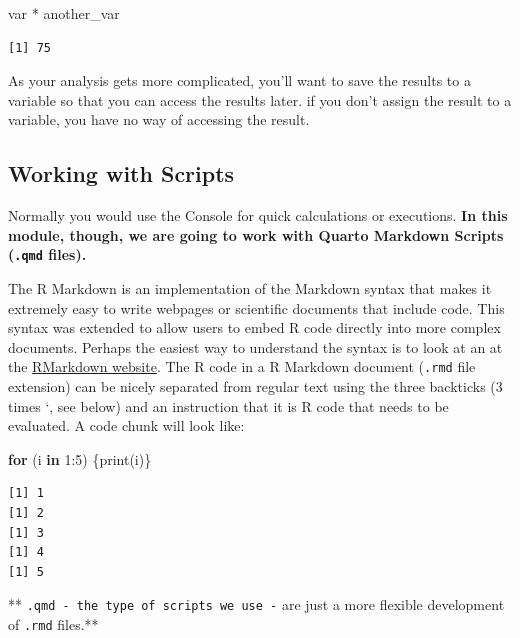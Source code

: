 \documentclass[
  letterpaper,
  DIV=11,
  numbers=noendperiod]{scrreprt}
\newenvironment{Shaded}{\begin{snugshade}}{\end{snugshade}}
\newcommand{\ControlFlowTok}[1]{\textcolor[rgb]{0.00,0.23,0.31}{\textbf{#1}}}
\newcommand{\DecValTok}[1]{\textcolor[rgb]{0.68,0.00,0.00}{#1}}
\newcommand{\FunctionTok}[1]{\textcolor[rgb]{0.28,0.35,0.67}{#1}}
\newcommand{\NormalTok}[1]{\textcolor[rgb]{0.00,0.23,0.31}{#1}}
\newcommand{\SpecialCharTok}[1]{\textcolor[rgb]{0.37,0.37,0.37}{#1}}
\begin{document}
\begin{Shaded}
\begin{Highlighting}[]
\NormalTok{var }\SpecialCharTok{*}\NormalTok{ another\_var }
\end{Highlighting}
\end{Shaded}

\begin{verbatim}
[1] 75
\end{verbatim}

As your analysis gets more complicated, you'll want to save the results
to a variable so that you can access the results later. if you don't
assign the result to a variable, you have no way of accessing the
result.

\subsection{Working with Scripts}\label{working-with-scripts}

Normally you would use the Console for quick calculations or executions.
\textbf{In this module, though, we are going to work with Quarto
Markdown Scripts (\texttt{.qmd} files).}

The R Markdown is an implementation of the Markdown syntax that makes it
extremely easy to write webpages or scientific documents that include
code. This syntax was extended to allow users to embed R code directly
into more complex documents. Perhaps the easiest way to understand the
syntax is to look at an at the
\href{http://rmarkdown.rstudio.com}{RMarkdown website}. The R code in a
R Markdown document (\texttt{.rmd} file extension) can be nicely
separated from regular text using the three backticks (3 times `, see
below) and an instruction that it is R code that needs to be evaluated.
A code chunk will look like:

\begin{Shaded}
\begin{Highlighting}[]
    \ControlFlowTok{for}\NormalTok{ (i }\ControlFlowTok{in} \DecValTok{1}\SpecialCharTok{:}\DecValTok{5}\NormalTok{) \{}\FunctionTok{print}\NormalTok{(i)\}}
\end{Highlighting}
\end{Shaded}

\begin{verbatim}
[1] 1
[1] 2
[1] 3
[1] 4
[1] 5
\end{verbatim}

** \texttt{.qmd\ -\ the\ type\ of\ scripts\ we\ use\ -} are just a more
flexible development of \texttt{.rmd} files.**
\end{document}
